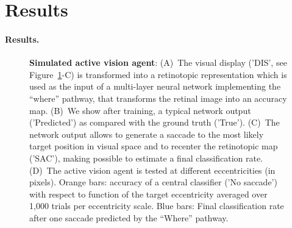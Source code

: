 \CNS
\section{Results}
\label{sec:results}
\else
\paragraph{Results. }
\fi
\begin{figure}[t!]%
\caption{
{\bf Simulated active vision agent}: 
(A)~The visual display ('DIS', see  Figure~\ref{fig:results}-C)  is transformed into a retinotopic representation which is used as the input of a multi-layer neural network implementing the ``where'' pathway, that transforms the retinal image into an accuracy map. (B)~We show after training, a typical network output  ('Predicted') as compared  with the ground truth ('True'). (C)~The network output allows to generate a saccade to the most likely target position in visual space and to recenter the retinotopic map ('SAC'), making possible to estimate a final classification rate. (D)~The active vision agent is tested at different eccentricities (in pixels). Orange bars: accuracy of a central classifier ('No saccade') with respect to  function of the target eccentricity averaged over 1,000 trials per eccentricity scale. Blue bars: Final classification rate after one saccade predicted by the ``Where'' pathway.
\label{fig:results}}%
\end{figure}%


